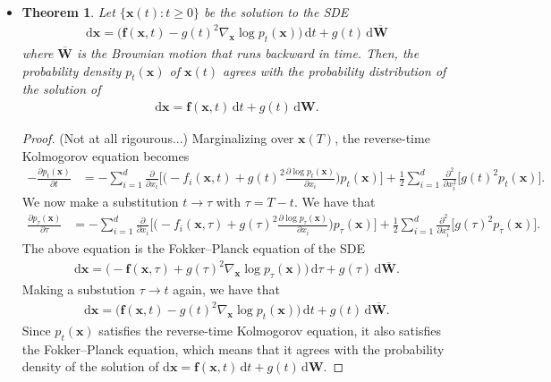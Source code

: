 \documentclass[10pt]{article}
\newtheorem{theorem}[lemma]{Theorem}
\newcommand{\dee}{\mathrm{d}}
\newcommand{\ve}[1]{\mathbf{#1}}
\begin{document}
\begin{itemize}
  \item \begin{theorem}
    Let $\{ \ve{x}(t) : t \geq 0 \}$ be the solution to the SDE
    \begin{align*}
      \dee\ve{x} = \big( \ve{f}(\ve{x},t) - g(t)^2 \nabla_{\ve{x}} \log p_t(\ve{x}) \big)\, \dee t + g(t)\, \dee \overline{\ve{W}}
    \end{align*}
    where $\overline{\ve{W}}$ is the Brownian motion that runs backward in time. Then, the probability density $p_t(\ve{x})$ of $\ve{x}(t)$ agrees with the probability distribution of the solution of
    \begin{align*}
      \dee\ve{x} = \ve{f}(\ve{x}, t)\, \dee t + g(t)\, \dee\ve{W}.
    \end{align*}
  \end{theorem}
  
  \begin{proof} (Not at all rigourous...)
    Marginalizing over $\ve{x}(T)$, the reverse-time Kolmogorov equation becomes
    \begin{align*}
      -\frac{\partial p_{t}(\ve{x})}{\partial t}
      &= - \sum_{i=1}^d \frac{\partial}{\partial x_i} \bigg[ \bigg( -f_i(\ve{x},t) + g(t)^2 \frac{\partial \log p_t(\ve{x})}{\partial x_i} \bigg) p_{t}(\ve{x}) \bigg] + \frac{1}{2} \sum_{i=1}^d \frac{\partial^2}{\partial x_i^2} \big[g(t)^2 p_{t}(\ve{x})\big].
    \end{align*}
    We now make a substitution $t \rightarrow \tau$ with $\tau = T-t$. We have that
    \begin{align*}
      \frac{\partial p_{\tau}(\ve{x})}{\partial \tau}
      &= - \sum_{i=1}^d \frac{\partial}{\partial x_i} \bigg[ \bigg( -f_i(\ve{x},\tau) + g(\tau)^2 \frac{\partial \log p_\tau(\ve{x})}{\partial x_i} \bigg) p_{\tau}(\ve{x}) \bigg] + \frac{1}{2} \sum_{i=1}^d \frac{\partial^2}{\partial x_i^2} \big[g(\tau)^2 p_{\tau}(\ve{x})\big].
    \end{align*}
    The above equation is the Fokker--Planck equation of the SDE
    \begin{align*}
      \dee \ve{x} = \Big( -\ve{f}(\ve{x},\tau) + g(\tau)^2 \nabla_{\ve{x}} \log p_\tau(\ve{x}) \Big)\, \dee\tau + g(\tau)\, \dee \overline{\ve{W}}.
    \end{align*}
    Making a substution $\tau \rightarrow t$ again, we have that
    \begin{align*}
      \dee \ve{x} = \Big( \ve{f}(\ve{x},t) - g(t)^2 \nabla_{\ve{x}} \log p_t(\ve{x}) \Big)\, \dee t + g(t)\, \dee \overline{\ve{W}}.
    \end{align*}
    Since $p_t(\ve{x})$ satisfies the reverse-time Kolmogorov equation, it also satisfies the Fokker--Planck equation, which means that it agrees with the probability density of the solution of $\dee\ve{x} = \ve{f}(\ve{x},t)\, \dee t + g(t)\, \dee\ve{W}$.
  \end{proof}  
\end{itemize}


  
\end{document}
